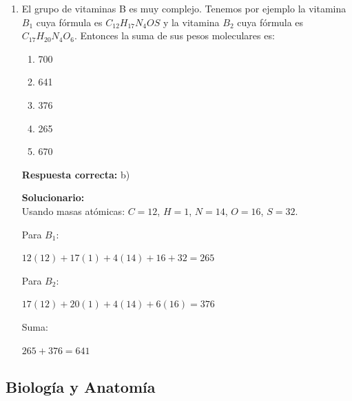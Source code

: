 \begin{enumerate}
	\vspace{2mm}
	\textbf{Solucionario:}\\
	Se identifica como cadena principal una de 11 carbonos, es decir, un undecano. Al numerar para obtener el menor conjunto de localizadores, se observan tres metilos en 2, 3 y 6, y un isobutil en 7. Por ello, el nombre correcto es:
	
	$\text{7-isobutil-2,3,6-trimetilundecano}$
	
	\vspace{6mm}
	
	\item El grupo de vitaminas B es muy complejo. Tenemos por ejemplo la vitamina $B_1$ cuya fórmula es $C_{12}H_{17}N_4OS$ y la vitamina $B_2$ cuya fórmula es $C_{17}H_{20}N_4O_6$. Entonces la suma de sus pesos moleculares es:
	\begin{enumerate}[label=\alph*)]
		\item 700
		\item 641
		\item 376
		\item 265
		\item 670
	\end{enumerate}
	\textbf{Respuesta correcta:} b)
	
	\vspace{2mm}
	\textbf{Solucionario:}\\
	Usando masas atómicas: $C=12$, $H=1$, $N=14$, $O=16$, $S=32$.
	
	Para $B_1$:
	
	$12(12)+17(1)+4(14)+16+32=265$
	
	Para $B_2$:
	
	$17(12)+20(1)+4(14)+6(16)=376$
	
	Suma:
	
	$265+376=641$
	
	\vspace{6mm}
	
\end{enumerate}

\subsection*{Biología y Anatomía}

